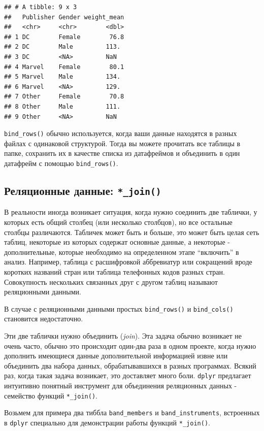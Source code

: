 \documentclass[
]{book}
\begin{document}
\begin{verbatim}
## # A tibble: 9 x 3
##   Publisher Gender weight_mean
##   <chr>     <chr>        <dbl>
## 1 DC        Female        76.8
## 2 DC        Male         113. 
## 3 DC        <NA>         NaN  
## 4 Marvel    Female        80.1
## 5 Marvel    Male         134. 
## 6 Marvel    <NA>         129. 
## 7 Other     Female        70.8
## 8 Other     Male         111. 
## 9 Other     <NA>         NaN
\end{verbatim}

\texttt{bind\_rows()} обычно используется, когда ваши данные находятся в разных файлах с одинаковой структурой. Тогда вы можете прочитать все таблицы в папке, сохранить их в качестве списка из датафреймов и объединить в один датафрейм с помощью \texttt{bind\_rows()}.

\hypertarget{tidy_join}{%
\subsection{\texorpdfstring{Реляционные данные: \texttt{*\_join()}}{Реляционные данные: *\_join()}}\label{tidy_join}}

В реальности иногда возникает ситуация, когда нужно соединить две таблички, у которых есть общий столбец (или несколько столбцов), но все остальные столбцы различаются. Табличек может быть и больше, это может быть целая сеть таблиц, некоторые из которых содержат основные данные, а некоторые - дополнительные, которые необходимо на определенном этапе ``включить'' в анализ. Например, таблица с расшифровкой аббревиатур или сокращений вроде коротких названий стран или таблица телефонных кодов разных стран. Совокупность нескольких связанных друг с другом таблиц называют реляционными данными.

В случае с реляционными данными простых \texttt{bind\_rows()} и \texttt{bind\_cols()} становится недостаточно.

Эти две таблички нужно объединить (\emph{join}). Эта задача обычно возникает не очень часто, обычно это происходит один-два раза в одном проекте, когда нужно дополнить имеющиеся данные дополнительной информацией извне или объединить два набора данных, обрабатывавшихся в разных программах. Всякий раз, когда такая задача возникает, это доставляет много боли. \texttt{dplyr} предлагает интуитивно понятный инструмент для объединения реляционных данных - семейство функций \texttt{*\_join()}.

Возьмем для примера два тиббла \texttt{band\_members} и \texttt{band\_instruments}, встроенных в \texttt{dplyr} специально для демонстрации работы функций \texttt{*\_join()}.
\end{document}
